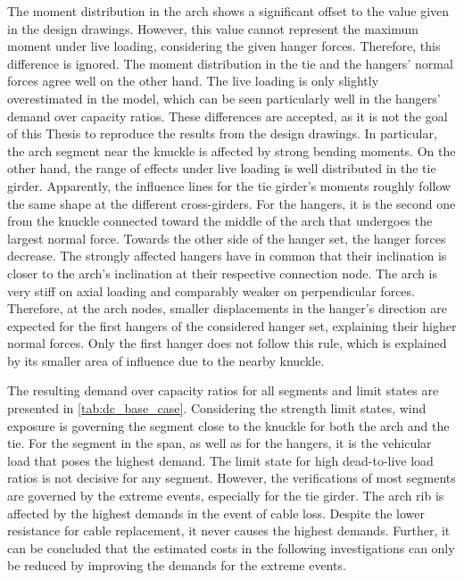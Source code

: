 The moment distribution in the arch shows a significant offset to the value given in the design drawings. However, this value cannot represent the maximum moment under live loading, considering the given hanger forces. Therefore, this difference is ignored. The moment distribution in the tie and the hangers' normal forces agree well on the other hand. The live loading is only slightly overestimated in the model, which can be seen particularly well in the hangers' demand over capacity ratios. These differences are accepted, as it is not the goal of this Thesis to reproduce the results from the design drawings. In particular, the arch segment near the knuckle is affected by strong bending moments. On the other hand, the range of effects under live loading is well distributed in the tie girder. Apparently, the influence lines for the tie girder's moments roughly follow the same shape at the different cross-girders. For the hangers, it is the second one from the knuckle connected toward the middle of the arch that undergoes the largest normal force. Towards the other side of the hanger set, the hanger forces decrease. The strongly affected hangers have in common that their inclination is closer to the arch's inclination at their respective connection node. The arch is very stiff on axial loading and comparably weaker on perpendicular forces. Therefore, at the arch nodes, smaller displacements in the hanger's direction are expected for the first hangers of the considered hanger set, explaining their higher normal forces. Only the first hanger does not follow this rule, which is explained by its smaller area of influence due to the nearby knuckle. \medskip

The resulting demand over capacity ratios for all segments and limit states are presented in \cref{tab:dc_base_case}. Considering the strength limit states, wind exposure is governing the segment close to the knuckle for both the arch and the tie. For the segment in the span, as well as for the hangers, it is the vehicular load that poses the highest demand. The limit state for high dead-to-live load ratios is not decisive for any segment. However, the verifications of most segments are governed by the extreme events, especially for the tie girder. The arch rib is affected by the highest demands in the event of cable loss. Despite the lower resistance for cable replacement, it never causes the highest demands. Further, it can be concluded that the estimated costs in the following investigations can only be reduced by improving the demands for the extreme events.


